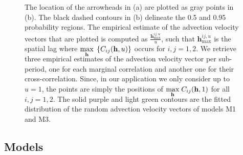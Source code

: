 \documentclass[12pt]{article}
\newcommand{\0}{\mathbf{0}}
\begin{document}
\begin{figure}[t!]
 \centering
 \quad
    \caption{\small The location of the arrowheads in (a) are plotted as gray points in (b). The black dashed contours in (b) delineate the 0.5 and 0.95 probability regions. The empirical estimate of the advection velocity vectors that are plotted is computed as $\frac{\mathbf{h}_{\max}^{ij,u}}{u}$, such that $\mathbf{h}_{\max}^{ij,u}$ is the spatial lag where $\smash{\displaystyle\max_{\mathbf{h}}}\; \left\{C_{ij}(\mathbf{h},u)\right\}$ occurs for  $i,j=1,2$. We retrieve three empirical estimates of the advection velocity vector per sub-period, one for each marginal correlation and another one for their cross-correlation. Since, in our application we only consider up to $u=1$, the points are simply the positions of $\smash{\displaystyle\max_{\mathbf{h}}}\; C_{ij}(\mathbf{h},1)$ for all $i,j=1,2$. The solid purple and light green contours are the fitted distribution of the random advection velocity vectors of models M1 and M3. }
    \label{fig:empiricaldistributionofV}
\end{figure}


\subsection{Models}
\end{document}
